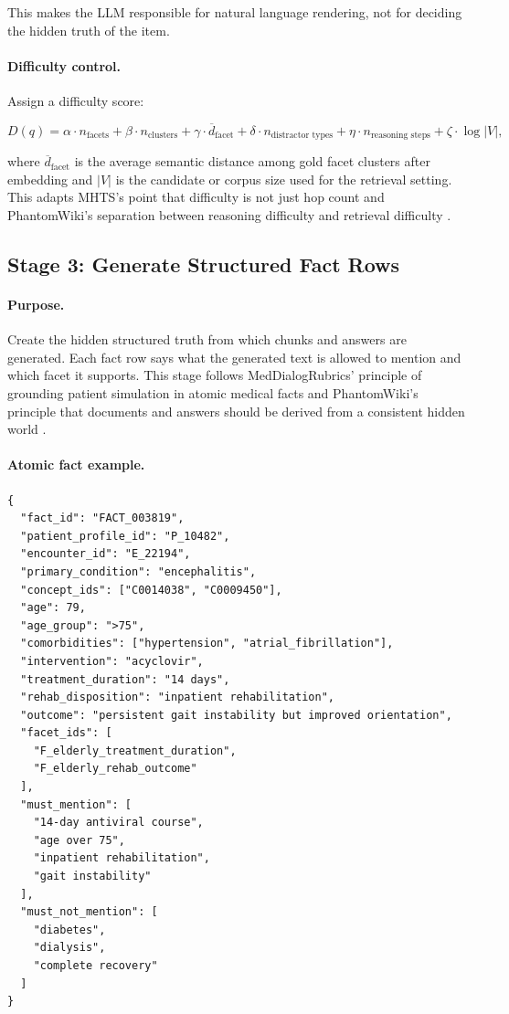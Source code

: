 \documentclass[11pt,a4paper]{article}
\newcommand{\stage}[2]{\subsection{\textcolor{betterblue}{#1}: #2}}
\begin{document}
This makes the LLM responsible for natural language rendering, not for deciding the hidden truth of the item.

\paragraph{Difficulty control.}
Assign a difficulty score:

\[
	D(q) = \alpha \cdot n_{\text{facets}} + \beta \cdot n_{\text{clusters}} + \gamma \cdot \overline{d}_{\text{facet}} + \delta \cdot n_{\text{distractor types}} + \eta \cdot n_{\text{reasoning steps}} + \zeta \cdot \log |V|,
\]

where $\overline{d}_{\text{facet}}$ is the average semantic distance among gold facet clusters after embedding and $|V|$ is the candidate or corpus size used for the retrieval setting. This adapts MHTS's point that difficulty is not just hop count \citep{lee2025mhts} and PhantomWiki's separation between reasoning difficulty and retrieval difficulty \citep{gong2025phantomwiki}.

\stage{Stage 3}{Generate Structured Fact Rows}

\paragraph{Purpose.}
Create the hidden structured truth from which chunks and answers are generated. Each fact row says what the generated text is allowed to mention and which facet it supports. This stage follows MedDialogRubrics' principle of grounding patient simulation in atomic medical facts \citep{gong2026meddialogrubrics} and PhantomWiki's principle that documents and answers should be derived from a consistent hidden world \citep{gong2025phantomwiki}.

\paragraph{Atomic fact example.}

\begin{lstlisting}[style=promptstyle]
{
  "fact_id": "FACT_003819",
  "patient_profile_id": "P_10482",
  "encounter_id": "E_22194",
  "primary_condition": "encephalitis",
  "concept_ids": ["C0014038", "C0009450"],
  "age": 79,
  "age_group": ">75",
  "comorbidities": ["hypertension", "atrial_fibrillation"],
  "intervention": "acyclovir",
  "treatment_duration": "14 days",
  "rehab_disposition": "inpatient rehabilitation",
  "outcome": "persistent gait instability but improved orientation",
  "facet_ids": [
    "F_elderly_treatment_duration",
    "F_elderly_rehab_outcome"
  ],
  "must_mention": [
    "14-day antiviral course",
    "age over 75",
    "inpatient rehabilitation",
    "gait instability"
  ],
  "must_not_mention": [
    "diabetes",
    "dialysis",
    "complete recovery"
  ]
}
\end{lstlisting}
\end{document}

